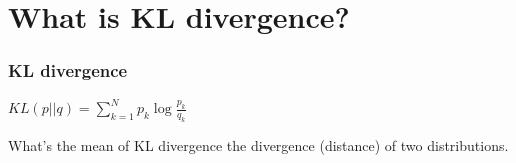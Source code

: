 \documentclass{beamer}
\begin{document}
\section{What is KL divergence?}
\begin{frame}
  \frametitle{KL divergence}
  \begin{definition}
   $KL(p||q) = \sum_{k=1}^{N} p_k \log \frac{p_k}{q_k} $
  \end{definition}

  \begin{block}{What's the mean of KL divergence}
     the divergence (distance) of two distributions. 
  \end{block}
\end{frame}
\end{document}
